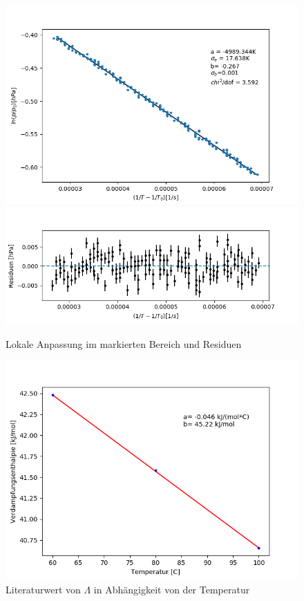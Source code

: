 \documentclass[12pt,a4paper]{article}
\begin{document}
\begin{figure}
\includegraphics[width=\linewidth]{Bilder/lokaler_fit_2A.png}
\includegraphics[width=\linewidth]{Bilder/lokale_Residuen_2A}
\caption[Lokale Anpassung]{Lokale Anpassung im markierten Bereich und Residuen}
\label{fig:fit_2A}
\end{figure}

\begin{figure}
\includegraphics[width=\linewidth]{Bilder/Lambda_Literaturwert_fit.png}
\caption[Literaturwert von $\Lambda$ in Abhängigkeit von der Temperatur]{Literaturwert von $\Lambda$ in Abhängigkeit von der Temperatur}
\label{fig:LiteraturwertLambda}
\end{figure}
\end{document}
